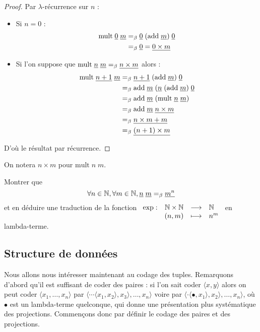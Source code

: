 \begin{proof}
    Par $\lambda$-récurrence sur $n$ :
    \begin{itemize}[label=$\bullet$]
        \item Si $n = 0$ :
        \begin{align*}
            \mathrm{mult} \;\underline 0\;\underline m &=_\beta \underline 0 \;(\mathrm{add}\;\underline m)\;\underline 0\\
            &=_\beta \underline 0 = \underline{0\times m}
        \end{align*}
        \item Si l'on suppose que $\mathrm{mult}\;\underline n\;\underline m =_\beta \underline{n\times m}$ alors :
        \begin{align*}
            \mathrm{mult}\;\underline{n+1}\;\underline m &=_\beta \underline{n+1} \;(\mathrm{add}\;\underline m)\;\underline 0\\
            &=_\beta \mathrm{add}\;\underline m\;(\underline n\;(\mathrm{add}\;\underline m)\;\underline 0\\
            &=_\beta \mathrm{add}\;\underline m\;(\mathrm{mult}\;\underline n\;\underline m)\\
            &=_\beta \mathrm{add}\;\underline m\;\underline{n\times m}\\
            &=_\beta \underline{n\times m+m}\\
            &=_\beta \underline{(n+1)\times m}
        \end{align*}
    \end{itemize}

    D'où le résultat par récurrence.
\end{proof}

On notera $n\times m$ pour $\mathrm{mult}\;n\;m$.

\begin{exo}
    Montrer que $$\forall n\in\mathbb{N},\forall m\in\mathbb{N},\underline n\;\underline m =_\beta \underline{m^n}$$ et en déduire une traduction de la fonction $\begin{array}[t]{lrcl} \mathrm{exp}: & \mathbb{N}\times\mathbb{N} & \longrightarrow & \mathbb{N} \\ & (n,m) & \longmapsto & n^m \end{array}$ en lambda-terme.
\end{exo}

\subsection{Structure de données}

Nous allons nous intéresser maintenant au codage des tuples. Remarquons d'abord qu'il est suffisant de coder des paires : si l'on sait coder $\langle x,y\rangle$ alors on peut coder $\langle x_1,\ldots,x_n\rangle$ par $\langle\cdots\langle x_1,x_2\rangle,x_3\rangle,\ldots,x_n\rangle$ voire par $\langle\cdot\langle \bullet,x_1\rangle,x_2\rangle,\ldots,x_n\rangle$, où $\bullet$ est un lambda-terme quelconque, qui donne une présentation plus systématique des projections. Commençons donc par définir le codage des paires et des projections.

